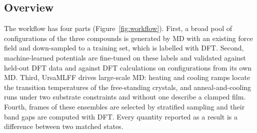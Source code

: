 
\subsection{Overview}
\label{sec:overview}

The workflow has four parts (Figure~\ref{fig:workflow}). First, a broad pool of
configurations of the three compounds is generated by MD with an existing force
field and down-sampled to a training set, which is labelled with DFT. Second, machine-learned
potentials are fine-tuned on these labels and validated against held-out DFT data and
against DFT calculations on configurations from its own MD. Third, UrsaMLFF
drives large-scale MD: heating and cooling ramps locate the transition
temperatures of the free-standing crystals, and anneal-and-cooling runs
under two substrate constraints and without one describe a clamped
film. Fourth, frames of these ensembles are selected by stratified sampling
and their band gaps are computed with DFT. Every quantity reported as a result
is a difference between two matched states.

